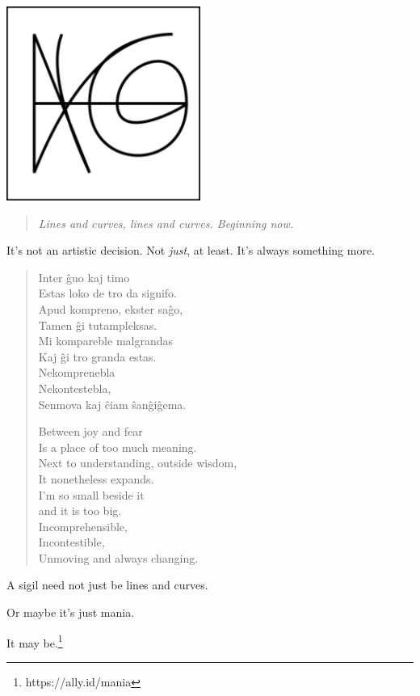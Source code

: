 \begin{paracol}{2}
\begin{rightcolumn}
    \null
    \vfill
    \noindent\includegraphics[width=2.5in]{assets/3.png}

    \begin{quote}
    \emph{Lines and curves, lines and curves. Beginning now.}
    \end{quote}
\end{rightcolumn}
\begin{leftcolumn}
\noindent It's not an artistic decision. Not \emph{just}, at least. It's always something more.

\begin{verse}
Inter ĝuo kaj timo\\
Estas loko de tro da signifo.\\
Apud kompreno, ekster saĝo,\\
Tamen ĝi tutampleksas.\\
Mi kompareble malgrandas\\
Kaj ĝi tro granda estas.\\
Nekomprenebla\\
Nekontestebla,\\
Senmova kaj ĉiam ŝanĝiĝema.

Between joy and fear\\
Is a place of too much meaning.\\
Next to understanding, outside wisdom,\\
It nonetheless expands.\\
I'm so small beside it\\
and it is too big.\\
Incomprehensible,\\
Incontestible,\\
Unmoving and always changing.
\end{verse}

\noindent A sigil need not just be lines and curves.

\begin{ally}
Or maybe it's just mania.
\end{ally}
It may be.\footnote{https://ally.id/mania}
\newpage
\end{leftcolumn}
\end{paracol}
